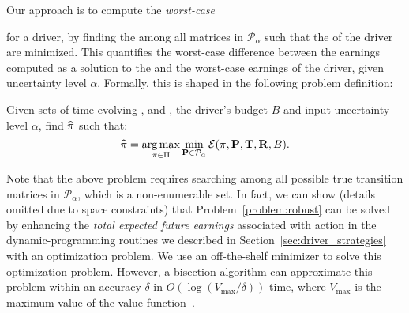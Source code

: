 Our approach is to compute the \emph{worst-case}{ {\totalexpectedearnings} for a driver, by
  finding the {\truetransitionmatrix} among all matrices in $\mathcal{P}_\alpha$ 
 such that the {\totalexpectedearnings} of the driver
 are minimized.  
This quantifies the worst-case difference between the earnings computed
as a solution to the {\originalproblem} and the worst-case earnings of the
driver, given uncertainty level $\alpha$.
Formally, this is shaped in the following problem definition:

\begin{problem}[{\robustproblem}]\label{problem:robust}
Given sets of time evolving {\countmatrix}, {\traveltimematrix} and {\rewardsmatrix}, the driver's budget $B$ and input uncertainty level $\alpha$,
find $\widehat{\pi}$
such that:
\[  \widehat{\pi} = \operatorname*{arg\,max}_{\pi\in \Pi}
\min_{{\mathbf{P}}\in\mathcal{P}_\alpha}\mathcal{E}(\pi,{\mathbf{P}},{\mathbf{T}},{\mathbf{R}},B).
\]
\end{problem}
Note that the above problem requires searching among all possible true transition 
matrices in $\mathcal{P}_\alpha$, which is a non-enumerable set. 
In fact, we can show (details omitted due to space constraints) that 
Problem~\ref{problem:robust} can be solved by enhancing the \emph{total expected future earnings} associated with {\getpassenger} action in the  dynamic-programming routines we described in Section~\ref{sec:driver_strategies}
with an optimization problem. We use an off-the-shelf minimizer to solve this optimization problem. However, a bisection algorithm can approximate this problem within an accuracy $\delta$ in $O(\log(V_{\max}/\delta))$ time, where $V_{\max}$ is the maximum value of the value function~\cite{nilim2004robustness}.


}
